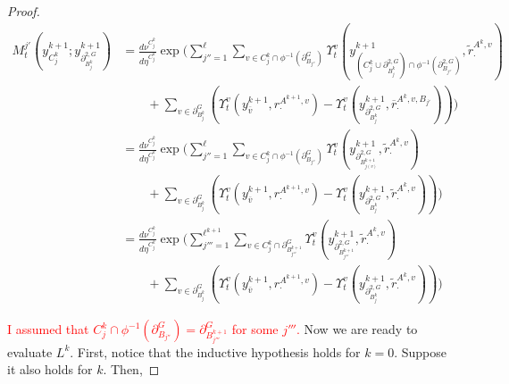 \documentclass[12pt]{article}
\newcommand{\ov}{\overline}
\newcommand{\tr}{\textcolor{red}}
\newcommand{\gneigh}[2]{\partial^{#1}_{#2}}			%
\newcommand{\dgneigh}[2]{\partial^{2,#1}_{#2}}		%
\newcommand{\cl}[1]{\ov{#1}}						%
\newcommand{\indx}[1]{^{#1}}						%
\newcommand{\rate}{r}								%
\newcommand{\vind}[1]{_{#1}}						%
\newcommand{\vpara}[1]{^{#1}}						%
\newcommand{\stpara}[1]{_{#1}}						%
\newcommand{\tpara}[1]{_{#1}}						%
\newcommand{\gvpara}[2]{^{#1,#2}}					%
\newcommand{\psize}{\ell}							%
\newcommand{\Xg}{Y}									%
\newcommand{\brate}{\alt{\rate}}					%
\newcommand{\alt}[1]{\tilde{#1}}					%
\newcommand{\mm}{\nu}								%
\newcommand{\bgrate}{\ov{\rate}}					%
\newcommand{\mmm}{\eta}								%
\newcommand{\ds}{\Upsilon}							%
\newcommand{\dense}{L}								%
\newcommand{\mdense}{M}								%
\newcommand{\xg}{y}									%
\newcommand{\gvjpara}[3]{^{#1,#2,#3}}				%
\newcommand{\jpara}[1]{^{#1}}						%
\begin{document}
\begin{proof}
\begin{align*}
\mdense\jpara{j'}\tpara{t}\left(\xg\indx{k+1}\vind{C_j\indx{k}};\xg\indx{k+1}\vind{\dgneigh{G}{B\indx{k}_j}}\right)&=  \frac{d\mm\vpara{C_j\indx{k}}}{d\mmm\vpara{C_j\indx{k}}}\exp\Bigg(\sum_{j'' =1}^{\psize}\sum_{v \in C_j\indx{k}\cap\phi^{-1}(\gneigh{G}{B_{j''}})} \ds\vpara{v}\tpara{t}\left(\xg\indx{k+1}\vind{\left(C_j\indx{k}\cup\dgneigh{G}{B_j\indx{k}}\right)\cap\phi^{-1}(\dgneigh{G}{B_{j''}})},\brate\gvpara{A\indx{k}}{v}\stpara{\cdot}\right)\\
&\hspace{24pt} + \sum_{v \in \gneigh{G}{B_j\indx{k}}}\left(\ds\vpara{v}\tpara{t}\left(\xg\indx{k+1}\vind{\cl{v}},\rate\gvpara{A\indx{k+1}}{v}\stpara{\cdot}\right) - \ds\vpara{v}\tpara{t}\left(\xg\indx{k+1}\vind{\dgneigh{G}{B_j\indx{k}}},\bgrate\gvjpara{A\indx{k}}{v}{B_{j'}}\stpara{\cdot}\right)\right)\Bigg)\\
&=\frac{d\mm\vpara{C_j\indx{k}}}{d\mmm\vpara{C_j\indx{k}}}\exp\Bigg(\sum_{j'' =1}^{\psize}\sum_{v \in C_j\indx{k}\cap\phi^{-1}(\gneigh{G}{B_{j''}})}\ds\vpara{v}\tpara{t}\left(\xg\indx{k+1}\vind{\dgneigh{G}{B_{j(v)}\indx{k+1}}},\brate\gvpara{A\indx{k}}{v}\stpara{\cdot}\right)\\
&\hspace{24pt} + \sum_{v \in \gneigh{G}{B_j\indx{k}}}\left(\ds\vpara{v}\tpara{t}\left(\xg\indx{k+1}\vind{\cl{v}},\rate\gvpara{A\indx{k+1}}{v}\stpara{\cdot}\right) - \ds\vpara{v}\tpara{t}\left(\xg\indx{k+1}\vind{\dgneigh{G}{B_j\indx{k}}},\brate\gvpara{A\indx{k}}{v}\stpara{\cdot}\right)\right)\Bigg)\\
&=\frac{d\mm\vpara{C_j\indx{k}}}{d\mmm\vpara{C_j\indx{k}}}\exp\Bigg(\sum_{j'''=1}^{\psize\indx{k+1}}\sum_{v \in C_j\indx{k}\cap\gneigh{G}{B_{j'''}\indx{k+1}}}\ds\vpara{v}\tpara{t}\left(\xg\indx{k+1}\vind{\dgneigh{G}{B_{j'''}\indx{k+1}}},\brate\gvpara{A\indx{k}}{v}\stpara{\cdot}\right)\\
&\hspace{24pt} + \sum_{v \in \gneigh{G}{B_j\indx{k}}}\left(\ds\vpara{v}\tpara{t}\left(\xg\indx{k+1}\vind{\cl{v}},\rate\gvpara{A\indx{k+1}}{v}\stpara{\cdot}\right) - \ds\vpara{v}\tpara{t}\left(\xg\indx{k+1}\vind{\dgneigh{G}{B_j\indx{k}}},\brate\gvpara{A\indx{k}}{v}\stpara{\cdot}\right)\right)\Bigg)
\end{align*}

\tr{I assumed that \(C_j\indx{k}\cap\phi^{-1}(\gneigh{G}{B_{j''}}) = \gneigh{G}{B_{j'''}\indx{k+1}}\) for some \(j'''\). }Now we are ready to evaluate \(\dense\indx{k}\). First, notice that the inductive hypothesis holds for \(k=0\). Suppose it also holds for \(k\). Then,


\end{proof}
\end{document}

